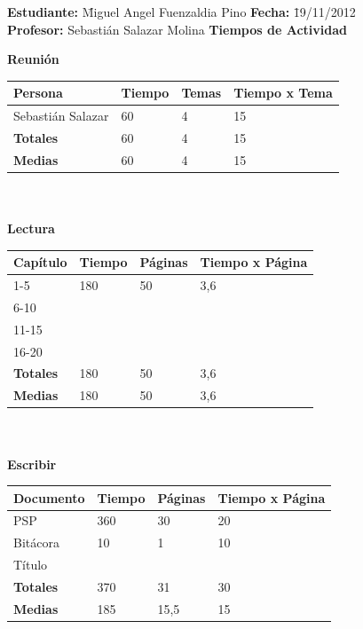 \documentclass[a4paper,12pt,openany,oneside]{book}
\begin{document}
\begin{tabbing}
\textbf{Estudiante:} \= Miguel Angel Fuenzaldia Pino \= \textbf{Fecha:} \= 19/11/2012\\
\textbf{Profesor:} \> Sebastián Salazar Molina \> \textbf{Tiempos de Actividad} \>  \\
\end{tabbing}
\textbf{Reunión}\\
\begin{tabular}{| l | l | l | l |}
\hline
\textbf{Persona} & \textbf{Tiempo} & \textbf{Temas} & \textbf{Tiempo x Tema}\\
\hline
Sebastián Salazar & 60 & 4 & 15\\
\hline
\textbf{Totales} & 60 & 4 & 15 \\
\hline
\textbf{Medias} & 60 & 4 & 15 \\
\hline
\end{tabular}
\\\\
\textbf{Lectura}\\
\begin{tabular}{| l | l | l | l |}
\hline
\textbf{Capítulo} & \textbf{Tiempo} & \textbf{Páginas} & \textbf{Tiempo x Página}\\
\hline
1-5   & 180 & 50 & 3,6 \\
\hline
6-10  & & & \\
\hline
11-15 & & & \\
\hline
16-20 & & & \\
\hline
\textbf{Totales} & 180 & 50 & 3,6 \\
\hline
\textbf{Medias} & 180 & 50 & 3,6 \\
\hline
\end{tabular}
\\\\
\textbf{Escribir}\\
\begin{tabular}{| l | l | l | l |}
\hline
\textbf{Documento} & \textbf{Tiempo} & \textbf{Páginas} & \textbf{Tiempo x Página}\\
\hline
PSP & 360 & 30 & 20 \\
\hline
Bitácora & 10 & 1 & 10 \\
\hline
Título & & & \\
\hline
\textbf{Totales} & 370 & 31 & 30 \\
\hline
\textbf{Medias} & 185 & 15,5 & 15 \\
\hline
\end{tabular}
\\\\
\end{document}
